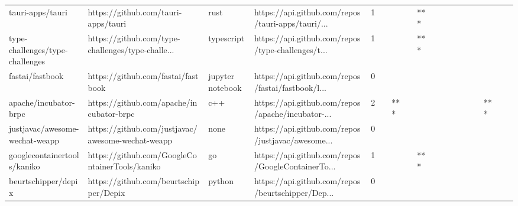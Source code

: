 \begin{tabular}{llllrlllllllllllll}
tauri-apps/tauri                                   &                https://github.com/tauri-apps/tauri &              rust &  https://api.github.com/repos/tauri-apps/tauri/... &       1 &         &        &           &            *** &                 &        &           &           &          &          &       &              &          \\
type-challenges/type-challenges                    &  https://github.com/type-challenges/type-challe... &        typescript &  https://api.github.com/repos/type-challenges/t... &       1 &         &        &           &            *** &                 &        &           &           &          &          &       &              &          \\
fastai/fastbook                                    &                 https://github.com/fastai/fastbook &  jupyter notebook &  https://api.github.com/repos/fastai/fastbook/l... &       0 &         &        &           &                &                 &        &           &           &          &          &       &              &          \\
apache/incubator-brpc                              &           https://github.com/apache/incubator-brpc &               c++ &  https://api.github.com/repos/apache/incubator-... &       2 &         &    *** &           &                &                 &        &           &           &          &          &   *** &              &          \\
justjavac/awesome-wechat-weapp                     &  https://github.com/justjavac/awesome-wechat-weapp &              none &  https://api.github.com/repos/justjavac/awesome... &       0 &         &        &           &                &                 &        &           &           &          &          &       &              &          \\
googlecontainertools/kaniko                        &     https://github.com/GoogleContainerTools/kaniko &                go &  https://api.github.com/repos/GoogleContainerTo... &       1 &         &        &           &            *** &                 &        &           &           &          &          &       &              &          \\
beurtschipper/depix                                &             https://github.com/beurtschipper/Depix &            python &  https://api.github.com/repos/beurtschipper/Dep... &       0 &         &        &           &                &                 &        &           &           &          &          &       &              &          \\

\end{tabular}
